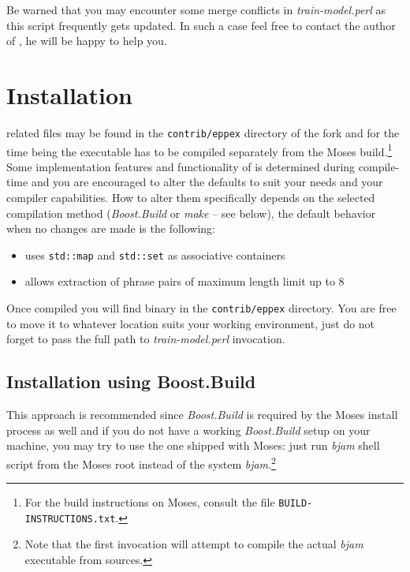 Be warned that you may encounter some merge conflicts in \emph{train-model.perl}
as this script frequently gets updated.
In such a case feel free to contact the author of \eppex{},
he will be happy to help you.

\section{Installation}
\label{sec:installation}

\Eppex{} related files may be found in the \texttt{contrib/eppex} directory of the \eppex{} fork
and for the time being the executable has to be compiled separately from the Moses
build.\footnote{For the build instructions on Moses, consult the file \texttt{BUILD-INSTRUCTIONS.txt}.}
Some implementation features and functionality of \eppex{} is determined during compile-time
and you are encouraged to alter the defaults to suit your needs and your compiler capabilities.
How to alter them specifically depends on the selected compilation method (\emph{Boost.Build} or
\emph{make} -- see below), the default behavior when no changes are made is the following:
\begin{itemize}
  \item \eppex{} uses \verb|std::map| and \verb|std::set| as associative containers
  \item \eppex{} allows extraction of phrase pairs of maximum length limit up to 8
\end{itemize}

Once compiled you will find \eppex{} binary in the \texttt{contrib/eppex} directory.
You are free to move it to whatever location suits your working environment,
just do not forget to pass the full path to \emph{train-model.perl} invocation.

\subsection*{Installation using Boost.Build}

This approach is recommended since \emph{Boost.Build}
is required by the Moses install process as well and if you do not have a working
\emph{Boost.Build} setup on your machine, you may try to use the one shipped with Moses:
just run \emph{bjam} shell script from the Moses root instead of the system \emph{bjam}.\footnote{Note
that the first invocation will attempt to compile the actual \emph{bjam} executable from sources.}

